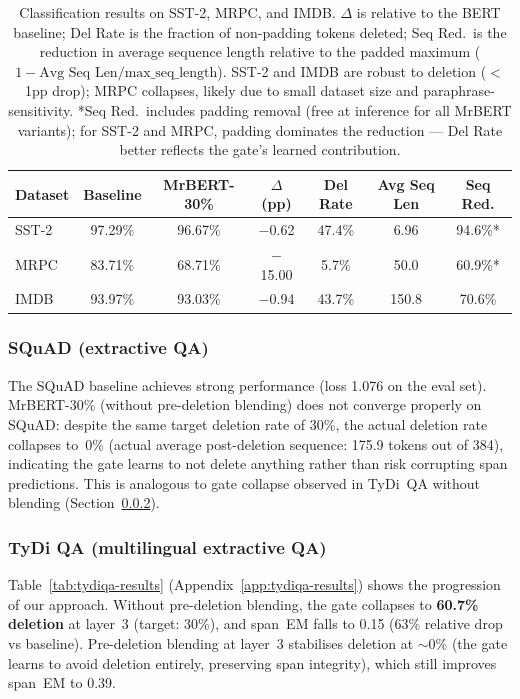 \documentclass{article} %
\begin{document}
\begin{table}[t]
\centering
\begin{tabular}{@{}lcccccc@{}}
\toprule
\textbf{Dataset} & \textbf{Baseline} & \textbf{MrBERT-30\%} & \textbf{$\Delta$ (pp)} & \textbf{Del Rate} & \textbf{Avg Seq Len} & \textbf{Seq Red.} \\
\midrule
SST-2 & 97.29\% & 96.67\% & $-$0.62 & 47.4\%  & 6.96  & 94.6\%* \\
MRPC  & 83.71\% & 68.71\% & $-$15.00 & 5.7\%   & 50.0  & 60.9\%* \\
IMDB  & 93.97\% & 93.03\% & $-$0.94 & 43.7\%  & 150.8 & 70.6\% \\
\bottomrule
\end{tabular}
\caption{Classification results on SST-2, MRPC, and IMDB. $\Delta$ is relative to the BERT baseline; Del Rate is the fraction of non-padding tokens deleted; Seq Red.\ is the reduction in average sequence length relative to the padded maximum ($1 - \text{Avg Seq Len}/\text{max\_seq\_length}$). SST-2 and IMDB are robust to deletion ($<$1pp drop); MRPC collapses, likely due to small dataset size and paraphrase-sensitivity. *Seq Red.\ includes padding removal (free at inference for all MrBERT variants); for SST-2 and MRPC, padding dominates the reduction --- Del Rate better reflects the gate's learned contribution.}
\label{tab:classification-results}
\end{table}

\subsubsection{SQuAD (extractive QA)}
\label{sec:results-squad}

The SQuAD baseline achieves strong performance (loss 1.076 on the eval set). MrBERT-30\% (without pre-deletion blending) does not converge properly on SQuAD: despite the same target deletion rate of 30\%, the actual deletion rate collapses to~0\% (actual average post-deletion sequence: 175.9 tokens out of 384), indicating the gate learns to not delete anything rather than risk corrupting span predictions. This is analogous to gate collapse observed in TyDi~QA without blending (Section~\ref{sec:results-tydiqa}).


\subsubsection{TyDi QA (multilingual extractive QA)}
\label{sec:results-tydiqa}

Table~\ref{tab:tydiqa-results} (Appendix~\ref{app:tydiqa-results}) shows the progression of our approach. Without pre-deletion blending, the gate collapses to \textbf{60.7\% deletion} at layer~3 (target: 30\%), and span~EM falls to 0.15 (63\% relative drop vs baseline). Pre-deletion blending at layer~3 stabilises deletion at $\sim$0\% (the gate learns to avoid deletion entirely, preserving span integrity), which still improves span~EM to 0.39.
\end{document}
